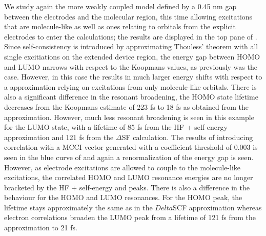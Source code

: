 We study again the more weakly coupled model defined by a 0.45 nm gap
between the electrodes and the molecular region, this time allowing
excitations that are molecule-like as well as ones relating to orbitals
from the explicit electrodes to enter the calculations;
the results are displayed in the top pane of . 
Since self-consistency is introduced by approximating Thouless' theorem
with all single excitiations on the extended device region, the energy gap
between HOMO and LUMO narrows with respect to the Koopmans values, as
previously was the case. However, in this case the \dscf results
in much larger energy shifts with respect to a \dscf approximation
relying on excitations from only molecule-like orbitals. There is also a
significant difference in the resonant broadening, the HOMO state lifetime
decreases from the Koopmans estimate of 223 fs to 18 fs as obtained from
the \dscf approximation. 
However, much less resonant broadening is seen in this example for the
LUMO state, with a lifetime of 85 fs from the HF + self-energy approximation
and 121 fs from the $\Delta$SF calculation. The results of introducing
correlation with a MCCI vector generated with a coefficient threshold of
0.003 is seen in the blue curve of  and again a
renormalization of the energy gap is seen.
However, as electrode excitations are allowed to couple to the
molecule-like excitations, the correlated HOMO and LUMO resonance energies
are no longer bracketed by the HF + self-energy and \dscf peaks.
There is also a difference in the behaviour for the HOMO and LUMO resonances.
For the HOMO peak, the lifetime stays approximately the same as in the
$Delta$SCF approximation whereas electron correlations broaden the LUMO
peak from a lifetime of 121 fs from the \dscf approximation to 21
fs. 

